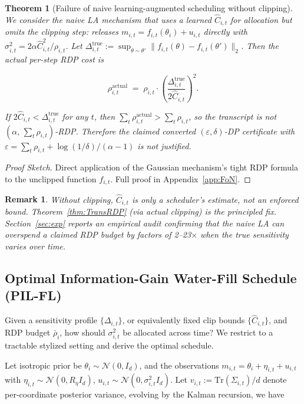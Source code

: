 \documentclass{article}
\newtheorem{theorem}{Theorem}
\newtheorem{remark}{Remark}
\begin{document}
\begin{theorem}[Failure of naive learning-augmented scheduling without clipping]
\label{thm:FoN}
We consider the naive LA mechanism that uses a learned $\hat{C}_{i,t}$ for allocation but omits the clipping step: releases $m_{i,t} = f_{i,t}(\theta_i) + u_{i,t}$ directly with $\sigma_{i,t}^2 = 2\alpha \hat{C}_{i,t}^2 / \rho_{i,t}$. Let $\Delta_{i,t}^{\mathrm{true}} := \sup_{\theta \sim \theta'}\|f_{i,t}(\theta) - f_{i,t}(\theta')\|_2$. Then the actual per-step RDP cost is

$$\rho_{i,t}^{\mathrm{actual}} \;=\; \rho_{i,t} \cdot \left(\frac{\Delta_{i,t}^{\mathrm{true}}}{2\hat{C}_{i,t}}\right)^2.$$

If $2\hat{C}_{i,t} < \Delta_{i,t}^{\mathrm{true}}$ for any $t$, then $\sum_t \rho_{i,t}^{\mathrm{actual}} > \sum_t \rho_{i,t}$, so the transcript is not $(\alpha,\, \sum_t \rho_{i,t})$-RDP. Therefore the claimed converted $(\varepsilon,\delta)$-DP certificate with $\varepsilon = \sum_t \rho_{i,t} + \log(1/\delta)/(\alpha-1)$ is not justified.
\end{theorem}

\begin{proof}
    [Proof Sketch]
     Direct application of the Gaussian mechanism's tight RDP formula to the unclipped function $f_{i,t}$. Full proof in Appendix~\ref{app:FoN}.
\end{proof}

\begin{remark}
    Without clipping, $\hat{C}_{i,t}$ is only a scheduler's estimate, not an enforced bound. Theorem~\ref{thm:TransRDP} (via actual clipping) is the principled fix. Section~\ref{sec:exp} reports an empirical audit confirming that the naive LA can overspend a claimed RDP budget by factors of 2–23$\times$ when the true sensitivity varies over time.
\end{remark}
 

\subsection{Optimal Information-Gain Water-Fill Schedule (PIL-FL)}

Given a sensitivity profile $\{\Delta_{i,t}\}$, or equivalently fixed clip bounds $\{\hat C_{i,t}\}$, and RDP budget $\bar\rho_i$, how should $\sigma_{i,t}^2$ be allocated across time? We restrict to a tractable stylized setting and derive the optimal schedule.

Let isotropic prior be $\theta_i \sim \mathcal{N}(0, I_d)$, and the observations $m_{i,t} = \theta_i + \eta_{i,t} + u_{i,t}$ with $\eta_{i,t} \sim \mathcal{N}(0, R_\eta I_d)$, $u_{i,t} \sim \mathcal{N}(0, \sigma_{i,t}^2 I_d)$. Let $v_{i,t} := \mathrm{Tr}(\Sigma_{i,t})/d$ denote per-coordinate posterior variance, evolving by the Kalman recursion, we have
\end{document}
